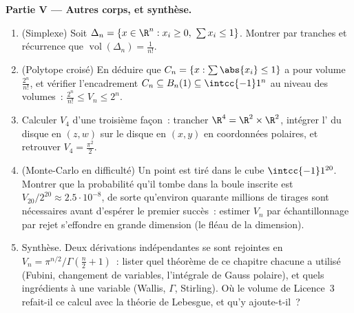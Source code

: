 \begin{problem}[{Problème du week-end --- $V_n =
\pi^{n/2}/\Gamma(\frac n2 + 1)$, et l'étrangeté des grandes
dimensions}]
\medskip
\noindent\textbf{Partie V --- Autres corps, et synthèse.}
\begin{enumerate}[resume]
  \item (Simplexe) Soit $\Delta_n = \{x \in \R^n : x_i \geq 0,\
        \sum x_i \leq 1\}$. Montrer par tranches et récurrence que
        $\operatorname{vol}(\Delta_n) = \frac1{n!}$.
  \item (Polytope croisé) En déduire que $C_n = \{x :
        \sum\abs{x_i} \leq 1\}$ a pour volume $\frac{2^n}{n!}$,
        et vérifier l'encadrement $C_n \subseteq B_n(1)
        \subseteq \intcc{-1}1^n$ au niveau des volumes~:
        $\frac{2^n}{n!} \leq V_n \leq 2^n$.
  \item Calculer $V_4$ d'une troisième façon~: trancher $\R^4 = \R^2 \times
        \R^2$, intégrer l'\omterm{def:b2:multint:domain}{aire} du disque en $(z, w)$ sur
        le disque en $(x, y)$ en coordonnées polaires, et retrouver
        $V_4 = \frac{\pi^2}2$.
  \item (Monte-Carlo en difficulté) Un point est tiré 
        dans le cube $\intcc{-1}1^{20}$. Montrer que la
        probabilité qu'il tombe dans la boule inscrite est
        $V_{20}/2^{20} \approx 2.5\cdot10^{-8}$, de sorte qu'environ
        quarante millions de tirages sont nécessaires avant d'espérer
        le premier succès~: estimer $V_n$ par échantillonnage par rejet
        s'effondre en grande dimension (le fléau de la
        dimension).
  \item Synthèse. Deux dérivations indépendantes se sont rejointes
        en $V_n = \pi^{n/2}/\Gamma(\frac n2 + 1)$~: lister quel
        théorème de ce chapitre chacune a utilisé (Fubini, changement
        de variables, l'intégrale de Gauss polaire), et quels
        ingrédients à une variable (Wallis, $\Gamma$, Stirling).
        Où le volume de Licence~3 refait-il ce calcul
        avec la théorie de Lebesgue, et qu'y ajoute-t-il~?
\end{enumerate}
\end{problem}
